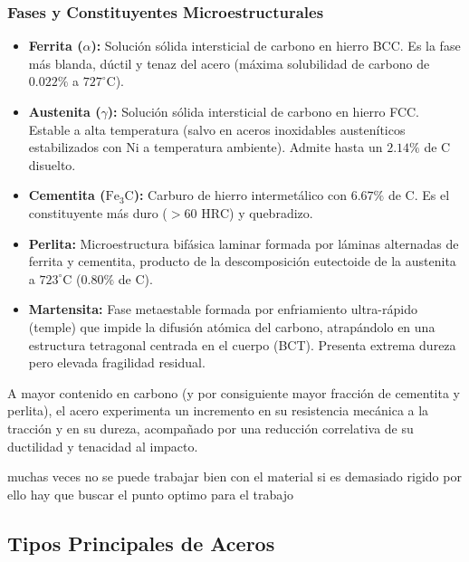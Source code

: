 \subsubsection{Fases y Constituyentes Microestructurales}
\begin{itemize}
    \item \textbf{Ferrita ($\alpha$):} Solución sólida intersticial de carbono en hierro BCC. Es la fase más blanda, dúctil y tenaz del acero (máxima solubilidad de carbono de $0.022\%$ a $727^\circ\text{C}$).
    \item \textbf{Austenita ($\gamma$):} Solución sólida intersticial de carbono en hierro FCC. Estable a alta temperatura (salvo en aceros inoxidables austeníticos estabilizados con Ni a temperatura ambiente). Admite hasta un $2.14\%$ de C disuelto.
    \item \textbf{Cementita ($\text{Fe}_3\text{C}$):} Carburo de hierro intermetálico con $6.67\%$ de C. Es el constituyente más duro ($>60\text{ HRC}$) y quebradizo.
    \item \textbf{Perlita:} Microestructura bifásica laminar formada por láminas alternadas de ferrita y cementita, producto de la descomposición eutectoide de la austenita a $723^\circ\text{C}$ ($0.80\%$ de C).
    \item \textbf{Martensita:} Fase metaestable formada por enfriamiento ultra-rápido (temple) que impide la difusión atómica del carbono, atrapándolo en una estructura tetragonal centrada en el cuerpo (BCT). Presenta extrema dureza pero elevada fragilidad residual.
\end{itemize}

A mayor contenido en carbono (y por consiguiente mayor fracción de cementita y perlita), el acero experimenta un incremento en su resistencia mecánica a la tracción y en su dureza, acompañado por una reducción correlativa de su ductilidad y tenacidad al impacto.

muchas veces no se puede trabajar bien con el material si es demasiado rigido por ello hay que buscar el punto optimo para el trabajo
\subsection{Tipos Principales de Aceros}

